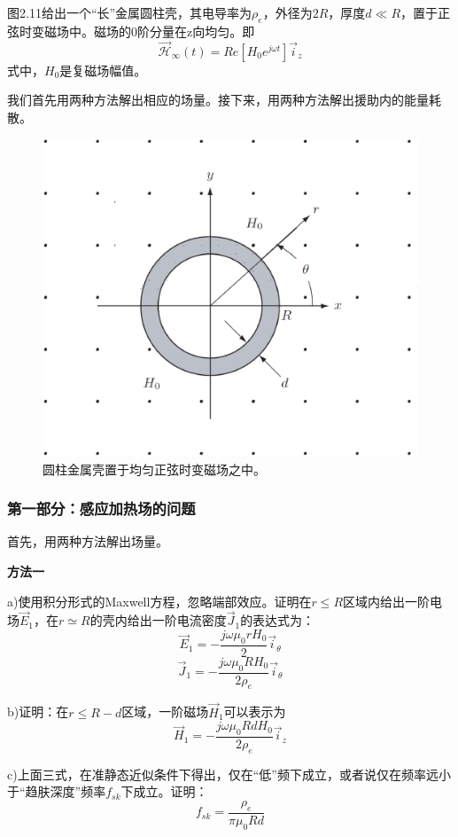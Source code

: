 图2.11给出一个“长”金属圆柱壳，其电导率为$\rho_e$，外径为$2R$，厚度$d\ll R$，置于正弦时变磁场中。磁场的0阶分量在z向均匀。即
$$\vec{\mathcal{H}}_\infty(t)=Re[H_0 e^{j\omega t}] \vec{i}_z$$
式中，$H_0$是复磁场幅值。

我们首先用两种方法解出相应的场量。接下来，用两种方法解出援助内的能量耗散。

\begin{figure}
  \centering
 \includegraphics[scale=0.3]{chpt2/figs/fig2.11.eps}
  \caption{圆柱金属壳置于均匀正弦时变磁场之中。}
\end{figure}

\subsubsection*{第一部分：感应加热场的问题}
首先，用两种方法解出场量。

\textbf{方法一}

a)使用积分形式的Maxwell方程，忽略端部效应。证明在$r\le R$区域内给出一阶电场$\vec{E}_1$，在$r\simeq R$的壳内给出一阶电流密度$\vec{J}_1$的表达式为：
$$\vec{E}_1=-\frac{j\omega \mu_0 r H_0}{2} \vec{i}_\theta$$
$$\vec{J}_1=-\frac{j\omega \mu_0 R H_0}{2\rho_e} \vec{i}_\theta$$

b)证明：在$r\le R-d$区域，一阶磁场$\vec{H}_1$可以表示为
$$\vec{H}_1=-\frac{j\omega \mu_0 R d H_0}{2\rho_e} \vec{i}_z$$

c)上面三式，在准静态近似条件下得出，仅在“低”频下成立，或者说仅在频率远小于“趋肤深度”频率$f_{sk}$下成立。证明：
$$f_{sk}=\frac{\rho_e}{\pi \mu_0 R d}$$

